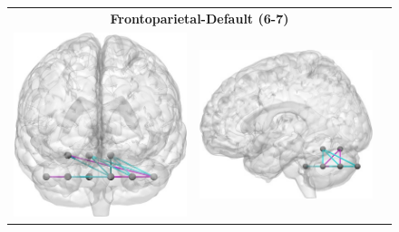 \begin{figure}[ptbh]
\begin{tabular}{ccc}
		\multicolumn{3}{c}{\textbf{\large{Frontoparietal-Default (6-7)}}} \VSPACE \\
		\includegraphics[height=\imheight]{12-12_anterior_flas.jpg}  &
		\includegraphics[height=\imheight]{12-12_lateral_flas.jpg}  &

\end{tabular}
\end{figure}
